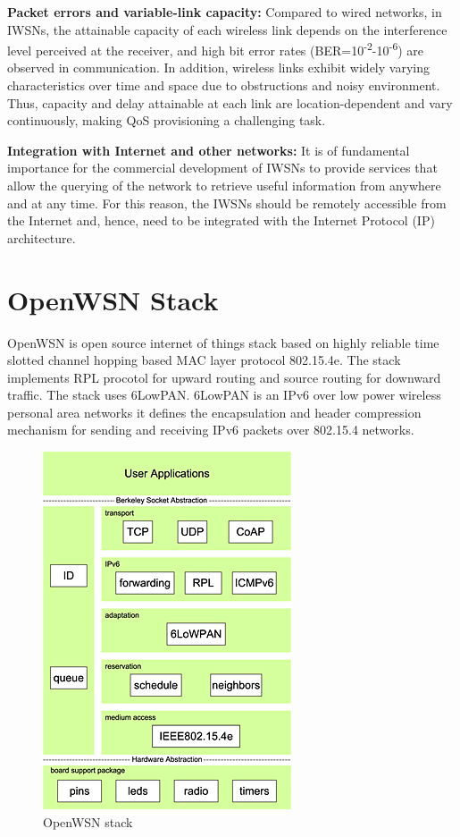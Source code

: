 \textbf{Packet errors and variable-link capacity:} Compared to wired networks, in IWSNs, the attainable capacity of each wireless link depends on the interference level perceived at the receiver, and high bit error rates (BER=10\textsuperscript{-2}-10\textsuperscript{-6}) are observed in communication. In addition, wireless links exhibit widely varying characteristics over time and space due to obstructions and noisy environment. Thus, capacity and delay attainable at each link are location-dependent and vary continuously, making QoS provisioning a challenging task.

\textbf{Integration with Internet and other networks:} It is of fundamental importance for the commercial development of IWSNs to provide services that allow the querying of the network to retrieve useful information from anywhere and at any time. For this reason, the IWSNs should be remotely accessible from the Internet and, hence, need to be integrated with the Internet Protocol (IP) architecture.

\section{OpenWSN Stack}
OpenWSN is open source internet of things stack based on highly reliable time slotted channel hopping based MAC layer protocol 802.15.4e. The stack implements RPL procotol for upward routing and source routing for downward traffic. The stack uses 6LowPAN. 6LowPAN is an IPv6 over low power wireless personal area networks it defines the encapsulation and header compression mechanism for sending and receiving IPv6 packets over 802.15.4 networks.

\begin{figure}[H]
	\includegraphics[scale=1,width=0.3\linewidth,center]{openwsn.png}
	\caption{OpenWSN stack\cite{ETT:ETT2558}}
	\label{fig:fig1}
\end{figure}
 
